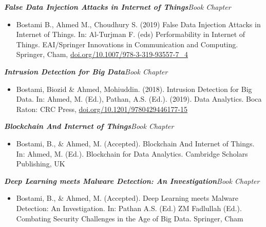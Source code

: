 \documentclass[11pt, a4paper]{awesome-cv}
\begin{document}
{\sl \textbf{False Data Injection Attacks in Internet of Things}\hfill    Book Chapter\\
	\vspace{-17pt}
\begin{itemize}
	\item
	Bostami B., Ahmed M., Choudhury S. (2019) False Data Injection Attacks in Internet of Things. In: Al-Turjman F. (eds) Performability in Internet of Things. EAI/Springer Innovations in Communication and Computing. Springer, Cham, \space \href{https://doi.org/10.1007/978-3-319-93557-7_4}{doi.org/10.1007/978-3-319-93557-7\_4}
		\vspace*{-.7em}
\end{itemize}

{\sl \textbf{Intrusion Detection for Big Data}\hfill    Book Chapter\\
	\vspace{-17pt}
	\begin{itemize}
		\item  Bostami, Biozid \& Ahmed, Mohiuddin. (2018). Intrusion Detection for Big Data. In: Ahmed, M. (Ed.), Pathan, A.S. (Ed.). (2019). Data Analytics. Boca Raton: CRC Press, \space \href{https://doi.org/10.1201/9780429446177-15}{doi.org/10.1201/9780429446177-15} 
		 \vspace*{-.7em}
	\end{itemize}


{\sl \textbf{Blockchain And Internet of Things}\hfill    Book Chapter\\
	\vspace{-17pt}
	\begin{itemize}
	\item Bostami, B., \& Ahmed, M. (Accepted). Blockchain And Internet of Things. In: Ahmed, M. (Ed.). Blockchain for Data Analytics. Cambridge Scholars Publishing, UK 
\end{itemize}

{\sl \textbf{Deep Learning meets Malware Detection: An Investigation}\hfill    Book Chapter\\
	\vspace{-17pt}
	\begin{itemize}
	\item Bostami, B., \& Ahmed, M. (Accepted). Deep Learning meets Malware Detection: An Investigation. In: Pathan A.S. (Ed.) ZM Fadlullah (Ed.). Combating Security Challenges in the Age of Big Data. Springer, Cham  
	\end{itemize}


\vspace{-18pt}
}}}}
\end{document}
